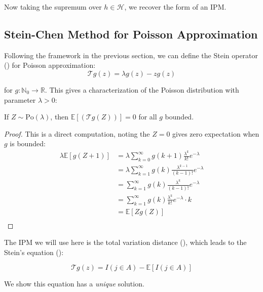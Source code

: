 \documentclass{article}
\begin{document}
Now taking the supremum over $h \in \mathcal{H}$, we recover the form of an IPM. 



\subsection{Stein-Chen Method for Poisson Approximation}  
Following the framework in the previous section, we can define the Stein operator () for Poisson approximation:
\begin{equation}
    \mathcal{T}g(z) = \lambda g(z) - zg(z)
\end{equation}

for $g: \mathbb{N}_0 \to \mathbb{R}$. This gives a characterization of the Poisson distribution with parameter $\lambda>0$:

\begin{proposition}
    \label{prop: direction1 poisson}
    If $Z\sim \text{Po}(\lambda)$, then $\mathbb{E}[(\mathcal{T}g(Z))]=0$ for all $g$ bounded.
\end{proposition}

\begin{proof}
This is a direct computation, noting the $Z=0$ gives zero expectation when $g$ is bounded:  
    \begin{align*}
        \lambda \mathbb{E}[g(Z+1)] &= \lambda \sum_{k=0}^\infty g(k+1) \frac{\lambda^k}{k!} e^{-\lambda}\\
        &= \lambda \sum_{k=1}^\infty g(k) \frac{\lambda^{k-1}}{(k-1)!} e^{-\lambda}\\
        &= \sum_{k=1}^\infty g(k) \frac{\lambda^k}{(k-1)!} e^{-\lambda}\\
        &= \sum_{k=1}^\infty g(k) \frac{\lambda^k}{k!} e^{-\lambda} \cdot k\\
        &= \mathbb{E}[Zg(Z)]\\
    \end{align*}
\end{proof}


The IPM we will use here is the total variation distance (), which leads to the Stein's equation ():

\begin{equation}
    \mathcal{T}g(z) = I(j \in A) - \mathbb{E}[I(j \in A)]
    \label{eq:poisson_stein_equation}
\end{equation}

We show this equation has a \textit{unique} solution.
\end{document}
